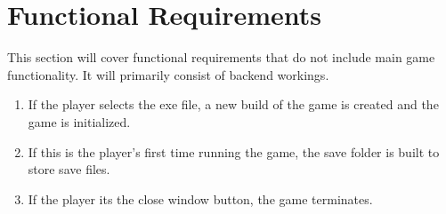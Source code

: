 \documentclass{article}
\begin{document}
\section{Functional Requirements}
\quad This section will cover functional requirements that do not include main game functionality. It will primarily consist of backend workings.
\begin{enumerate}[{FR}1. ]
	\item If the player selects the exe file, a new build of the game is created and the game is initialized.
	\item If this is the player's first time running the game, the save folder is built to store save files.
	\item If the player its the close window button, the game terminates.
\end{enumerate}
\end{document}
